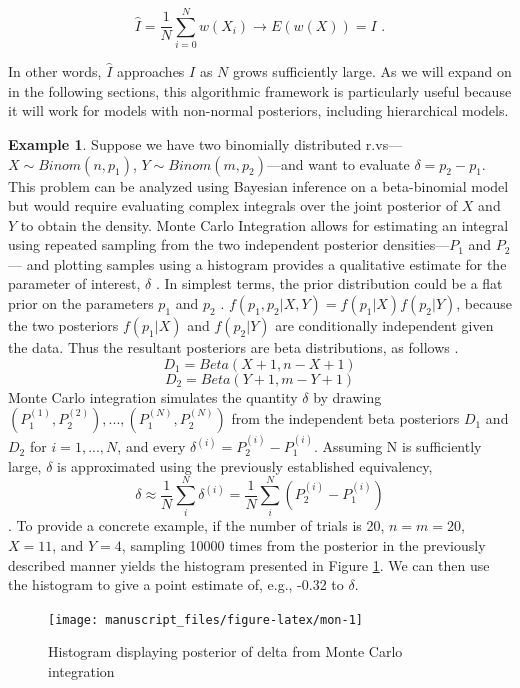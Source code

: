 \documentclass[
  12pt,
  oneside]{book}
\theoremstyle{definition}
\theoremstyle{definition}
\newtheorem{example}{Example}[chapter]
\theoremstyle{definition}
\theoremstyle{remark}
\begin{document}
\[\hat{I}=\frac{1}{N}\sum_{i=0}^{N}w(X_{i})\rightarrow E(w(X))=I \textrm{ .}\]

In other words, \(\hat{I}\) approaches \(I\) as \(N\) grows sufficiently large.
As we will expand on in the following sections, this algorithmic framework is particularly useful because it will work for models with non-normal posteriors, including hierarchical models.

\begin{example}
\protect\hypertarget{exm:montecarl}{}{\label{exm:montecarl} }Suppose we have two binomially distributed r.vs---\(X \sim Binom(n,p_1)\), \(Y \sim Binom(m,p_2)\)---and want to evaluate \(\delta = p_2 - p_1\).
This problem can be analyzed using Bayesian inference on a beta-binomial model but would require evaluating complex integrals over the joint posterior of \(X\) and \(Y\) to obtain the density.
Monte Carlo Integration allows for estimating an integral using repeated sampling from the two independent posterior densities---\(P_1\) and \(P_2\)--- and plotting samples using a histogram provides a qualitative estimate for the parameter of interest, \(\delta\) \citep[  24.2]{Wasserman2004}.
In simplest terms, the prior distribution could be a flat prior on the parameters \(p_1\) and \(p_2\) \citep[  24.2, \citet{Bloom2014}]{Wasserman2004}.
\(f(p_1,p_2|X,Y)=f(p_1|X)f(p_2|Y)\), because the two posteriors \(f(p_1|X)\) and \(f(p_2|Y)\) are conditionally independent given the data.
Thus the resultant posteriors are beta distributions, as follows \citep{Bloom2014}.
\[D_1 = Beta(X+1,n-X+1)\]
\[D_2 = Beta(Y+1,m-Y+1)\]
Monte Carlo integration simulates the quantity \(\delta\) by drawing \((P_1^{(1)},P_2^{(2)}),...,(P_1^{(N)},P_2^{(N)})\) from the independent beta posteriors \(D_1\) and \(D_2\) for \(i=1,...,N\), and every \(\delta^{(i)}=P_2^{(i)} - P_1^{(i)}\).
Assuming N is sufficiently large, \(\delta\) is approximated using the previously established equivalency, \[\delta \approx \frac{1}{N} \sum_i^N \delta^{(i)} = \frac{1}{N} \sum_i^N (P_2^{(i)} - P_1^{(i)})\] \citep[  24.2]{Wasserman2004}.
To provide a concrete example, if the number of trials is 20, \(n=m=20\), \(X = 11\), and \(Y = 4\), sampling 10000 times from the posterior in the previously described manner yields the histogram presented in Figure \ref{fig:mon}.
We can then use the histogram to give a point estimate of, e.g., -0.32 to \(\delta\).
\end{example}

\begin{figure}

{\centering \texttt{[image: manuscript\_files/figure-latex/mon-1]} 

}

\caption{Histogram displaying posterior of delta from Monte Carlo integration}\label{fig:mon}
\end{figure}
\end{document}
